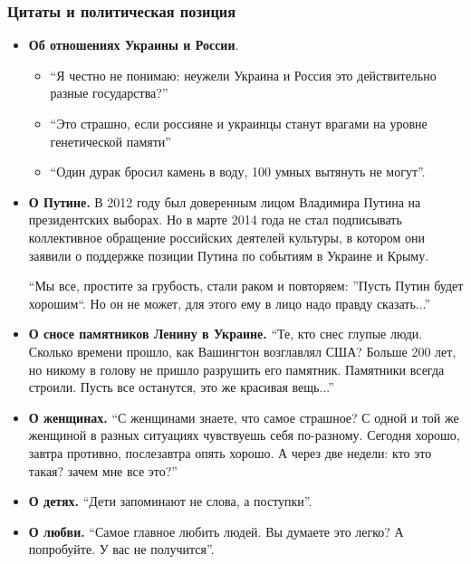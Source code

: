  
 
 

\subsubsection{Цитаты и политическая позиция}
\label{sec:14_11_2020.news.ua.strana.1.deaths.armen_dzhiharnajan.citations}

\begin{itemize}
	
	\item \textbf{Об отношениях Украины и России}. 
		\begin{itemize}
			\item \enquote{Я честно не понимаю: неужели Украина и
			Россия \dshM это действительно разные государства?}
			
			\item \enquote{Это страшно, если россияне и украинцы станут врагами на уровне
			генетической памяти}
			
			\item \enquote{Один дурак бросил камень в воду, 100 умных вытянуть не могут}.
		\end{itemize}

	\item \textbf{О Путине.} В 2012 году был доверенным лицом Владимира Путина на
   президентских выборах. Но в марте 2014 года не стал подписывать
   коллективное обращение российских деятелей культуры, в котором они заявили
   о поддержке позиции Путина по событиям в Украине и Крыму.

   \enquote{Мы все, простите за грубость, стали раком и повторяем: }Пусть Путин будет
   хорошим\enquote{. Но он не может, для этого ему в лицо надо правду сказать...}

	\item \textbf{О сносе памятников Ленину в Украине.} \enquote{Те, кто снес \dshM глупые люди. Сколько
   времени прошло, как Вашингтон возглавлял США? Больше 200 лет, но никому в
   голову не пришло разрушить его памятник. Памятники всегда строили. Пусть
   все останутся, это же красивая вещь...}

	\item \textbf{О женщинах.} \enquote{С женщинами знаете, что самое страшное? С одной и той же
   женщиной в разных ситуациях чувствуешь себя по-разному. Сегодня \dshM хорошо,
   завтра \dshM противно, послезавтра \dshM опять хорошо. А через две недели: кто это
   такая? зачем мне все это?}

	\item 	\textbf{О детях.} \enquote{Дети запоминают не слова, а поступки}.
	\item 	\textbf{О любви.} \enquote{Самое главное \dshM любить людей. Вы думаете это легко? А
   попробуйте. У вас не получится}.

\end{itemize}

